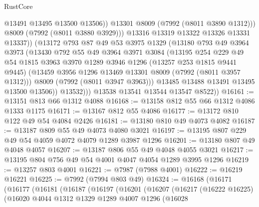 \begin{lexlean}{RustCore}
\begin{coremodule}
                        @13491
                        @13495
                        @13500
                        @13506))
                    @13301
                    @8009
                    (@7992 (@8011 @3890 @1312)))
                  @8009
                  (@7992 (@8011 @3880 @3929)))
                @13316
                @13319
                @13322
                @13326
                @13331
                @13337))
            (@13172
              @793
              @87
              @49
              @53
              @3975
              @1329
              (@13180
                @793
                @49
                @3964
                @3973
                (@13430
                  @792
                  @55
                  @49
                  @3964
                  @3971
                  @3084
                  (@13195
                    @254
                    @229
                    @49
                    @54
                    @1815
                    @3963
                    @3970
                    @1289
                    @3946
                    @1296
                    (@13257 @253 @1815 @9441 @9445)
                    (@13459 @3956 @1296 @13469 @13301 @8009 (@7992 (@8011 @3957 @1312)))
                    @8009
                    (@7992 (@8011 @3947 @3963)))
                  @13485
                  @13488
                  @13491
                  @13495
                  @13500
                  @13506))
              @13532)))
        @13538
        @13541
        @13544
        @13547
        @8522))
@16161 := @13151 @813 @66 @1312 @4088
@16168 := @13158 @812 @55 @66 @1312 @4086 @1333 @1175
@16171 := @13167 @812 @55 @4086
@16177 := @13172 @810 @122 @49 @54 @4084 @2426
@16181 := @13180 @810 @49 @4073 @4082
@16187 := @13187 @809 @55 @49 @4073 @4080 @3021
@16197 := @13195 @807 @229 @49 @54 @4059 @4072 @4079 @1289 @3987 @1296
@16201 := @13180 @807 @49 @4048 @4057
@16207 := @13187 @806 @55 @49 @4048 @4055 @3021
@16217 := @13195 @804 @756 @49 @54 @4001 @4047 @4054 @1289 @3995 @1296
@16219 := @13257 @803 @4001
@16221 := @7987 (@7988 @4001)
@16222 := @16219 @16221
@16225 := @7992 (@7994 @803 @49)
@16324 := @16168
    (@16171
      (@16177
        (@16181
          (@16187
            (@16197
              (@16201
                (@16207
                  (@16217
                    (@16222 @16225)
                    (@16020
                      @4044
                      @1312
                      @1329
                      @1289
                      @4007
                      @1296
                      (@16028

\end{coremodule}
\end{lexlean}
